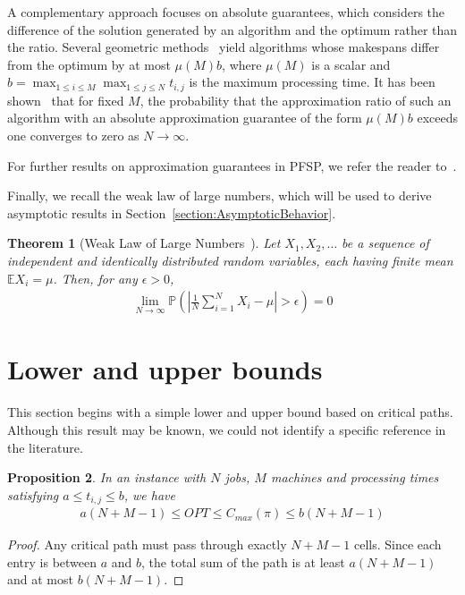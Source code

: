 \documentclass{article}
\theoremstyle{thmstyleone}%
\newtheorem{theorem}{Theorem}%
\newtheorem{proposition}[theorem]{Proposition}%
\theoremstyle{thmstyletwo}%
\theoremstyle{thmstylethree}%
\begin{document}
A complementary approach focuses on absolute guarantees, which considers the difference of the solution generated by an algorithm and the optimum rather than the ratio. 
Several geometric methods~\cite{Geo1, Geo2, Geo3} yield algorithms whose makespans differ from the optimum by at most $\mu(M)b$, where $\mu(M)$ is a scalar and $b = \max_{1 \leq i \leq M} \max_{1 \leq j \leq N} t_{i,j}$ is the maximum processing  time. 
It has been shown~\citep{SurveyPerformanceGuarantees} that for fixed $M$, the probability that the approximation ratio of such an algorithm with an absolute approximation guarantee of the form $\mu(M)b$ exceeds one converges to zero as $N \to \infty$. 

For further results on approximation guarantees in PFSP, we refer the reader to~\cite{HeuristicWorstCase, SurveyPerformanceGuarantees}. 

Finally, we recall the weak law of large numbers, which will be used to derive asymptotic results in Section~\ref{section:AsymptoticBehavior}. 

\begin{theorem}[Weak Law of Large Numbers~\cite{ProbabilityBook}]
\label{Teo:WLLN}
Let $X_1, X_2, \dots$ be a sequence of independent and identically distributed random variables, each having finite mean $\mathbb{E}X_i = \mu$. Then, for any $\epsilon > 0$,
\begin{align*}
   \lim_{N \to \infty} \mathbb{P} \left(  \left| \frac{1}{N} \sum_{i = 1}^N X_i - \mu  \right| > \epsilon \right) = 0
\end{align*}
\end{theorem}


\section{Lower and upper bounds}
\label{sectioni:NewLB}

This section begins with a simple lower and upper bound based on critical paths. 
Although this result may be known, we could not identify a specific reference in the literature.  

\begin{proposition}
\label{Prop:NewBounds}
In an instance with $N$ jobs, $M$ machines and processing times satisfying $a \leq t_{i,j} \leq b$, we have 
\begin{align*}
    a(N + M - 1) \leq OPT \leq C_{max}(\pi) \leq b(N + M - 1)
\end{align*}
\end{proposition}
\begin{proof}
Any critical path must pass through exactly $N + M - 1$ cells. Since each entry is between $a$ and $b$, the total sum of the path is at least $a(N + M - 1)$ and at most $b(N + M - 1)$. 
\end{proof}
\end{document}
